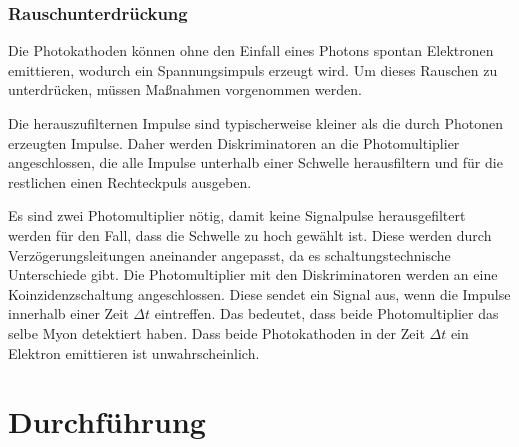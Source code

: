 \subsubsection{Rauschunterdrückung}
Die Photokathoden können ohne den Einfall eines Photons spontan Elektronen emittieren, wodurch ein Spannungsimpuls erzeugt wird. Um dieses Rauschen zu unterdrücken, müssen Maßnahmen vorgenommen werden.

Die herauszufilternen Impulse sind typischerweise kleiner als die durch Photonen erzeugten Impulse. Daher werden Diskriminatoren an die Photomultiplier angeschlossen, die alle Impulse unterhalb einer Schwelle herausfiltern und für die restlichen einen Rechteckpuls ausgeben.

Es sind zwei Photomultiplier nötig, damit keine Signalpulse herausgefiltert werden für den Fall, dass die Schwelle zu hoch gewählt ist. Diese werden durch Verzögerungsleitungen aneinander angepasst, da es schaltungstechnische Unterschiede gibt. Die Photomultiplier mit den Diskriminatoren werden an eine Koinzidenzschaltung angeschlossen. Diese sendet ein Signal aus, wenn die Impulse innerhalb einer Zeit $\Delta t$ eintreffen. Das bedeutet, dass beide Photomultiplier das selbe Myon detektiert haben. Dass beide Photokathoden in der Zeit $\Delta t$ ein Elektron emittieren ist unwahrscheinlich.


\section{Durchführung}

